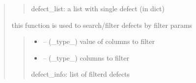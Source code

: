 \documentclass[letterpaper,10pt,english]{sphinxmanual}
\begin{document}
\begin{quote}
\begin{savenotes}
\begin{fulllineitems}
\begin{savenotes}
\begin{fulllineitems}
\begin{quote}
\begin{description}
\sphinxAtStartPar
defect\_list: a list with single defect (in dict)

\end{description}\end{quote}

\end{fulllineitems}\end{savenotes}


\begin{savenotes}\begin{fulllineitems}
\label{\detokenize{setting/database_utils:oxin.database_utils.dataBaseUtils.search_defect_by_filter}}
\pysigstartsignatures
{}
\pysigstopsignatures
\sphinxAtStartPar
this function is used to search/filter defects by filter params
\begin{quote}\begin{description}
\begin{itemize}
\item {} 
\sphinxAtStartPar
{} – (\_type\_) value of columns to filter

\item {} 
\sphinxAtStartPar
{} – (\_type\_) columns to filter

\end{itemize}

\sphinxAtStartPar
defect\_info: list of filterd defects

\end{description}\end{quote}

\end{fulllineitems}\end{savenotes}



\end{fulllineitems}
\end{savenotes}
\end{quote}
\end{document}
